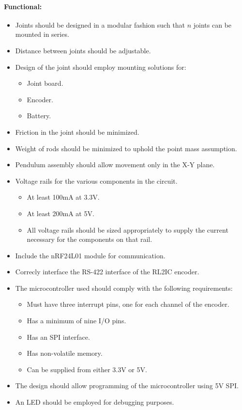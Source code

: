 \paragraph{Functional:}
\begin{itemize}
	\item Joints should be designed in a modular fashion such that $n$ joints can be mounted in series.
	\item Distance between joints should be adjustable.
	\item Design of the joint should employ mounting solutions for:
	\begin{itemize}
		\item Joint board.
		\item Encoder.
		\item Battery. 
	\end{itemize}
	\item Friction in the joint should be minimized.
	\item Weight of rods should be minimized to uphold the point mass assumption.
	\item Pendulum assembly should allow movement only in the X-Y plane. 

	\item Voltage rails for the various components in the circuit.
	\begin{itemize}
		\item At least 100mA at 3.3V.
		\item At least 200mA at 5V.
		\item All voltage rails should be sized appropriately to supply the current necessary for the components on that rail.
	\end{itemize}

	\item Include the nRF24L01 module for communication.
	\item Correcly interface the RS-422 interface of the RL2IC encoder.

	\item  The microcontroller used should comply with the following requirements:
	\begin{itemize}
		\item Must have three interrupt pins, one for each channel of the encoder.
		\item Has a minimum of nine I/O pins.
		\item Has an SPI interface.
		\item Has non-volatile memory.
		\item Can be supplied from either 3.3V or 5V.
	\end{itemize}
	\item The design should allow programming of the microcontroller using 5V SPI.
	\item An LED should be employed for debugging purposes.
\end{itemize}



